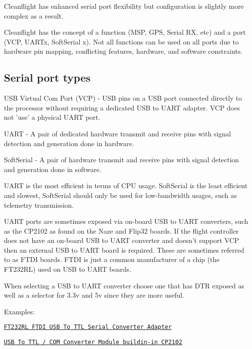 Cleanflight has enhanced serial port flexibility but configuration is slightly more complex as a result.

Cleanflight has the concept of a function (M\+S\+P, G\+P\+S, Serial R\+X, etc) and a port (V\+C\+P, U\+A\+R\+Tx, Soft\+Serial x). Not all functions can be used on all ports due to hardware pin mapping, conflicting features, hardware, and software constraints.

\subsection*{Serial port types}


\begin{DoxyItemize}
\item U\+S\+B Virtual Com Port (V\+C\+P) -\/ U\+S\+B pins on a U\+S\+B port connected directly to the processor without requiring a dedicated U\+S\+B to U\+A\+R\+T adapter. V\+C\+P does not 'use' a physical U\+A\+R\+T port.
\item U\+A\+R\+T -\/ A pair of dedicated hardware transmit and receive pins with signal detection and generation done in hardware.
\item Soft\+Serial -\/ A pair of hardware transmit and receive pins with signal detection and generation done in software.
\end{DoxyItemize}

U\+A\+R\+T is the most efficient in terms of C\+P\+U usage. Soft\+Serial is the least efficient and slowest, Soft\+Serial should only be used for low-\/bandwidth usages, such as telemetry transmission.

U\+A\+R\+T ports are sometimes exposed via on-\/board U\+S\+B to U\+A\+R\+T converters, such as the C\+P2102 as found on the Naze and Flip32 boards. If the flight controller does not have an on-\/board U\+S\+B to U\+A\+R\+T converter and doesn't support V\+C\+P then an external U\+S\+B to U\+A\+R\+T board is required. These are sometimes referred to as F\+T\+D\+I boards. F\+T\+D\+I is just a common manufacturer of a chip (the F\+T232\+R\+L) used on U\+S\+B to U\+A\+R\+T boards.

When selecting a U\+S\+B to U\+A\+R\+T converter choose one that has D\+T\+R exposed as well as a selector for 3.\+3v and 5v since they are more useful.

Examples\+:


\begin{DoxyItemize}
\item \href{http://www.banggood.com/FT232RL-FTDI-USB-To-TTL-Serial-Converter-Adapter-Module-For-Arduino-p-917226.html}{\tt F\+T232\+R\+L F\+T\+D\+I U\+S\+B To T\+T\+L Serial Converter Adapter}
\item \href{http://www.banggood.com/Wholesale-USB-To-TTL-Or-COM-Converter-Module-Buildin-in-CP2102-New-p-27989.html}{\tt U\+S\+B To T\+T\+L / C\+O\+M Converter Module buildin-\/in C\+P2102}
\end{DoxyItemize}

